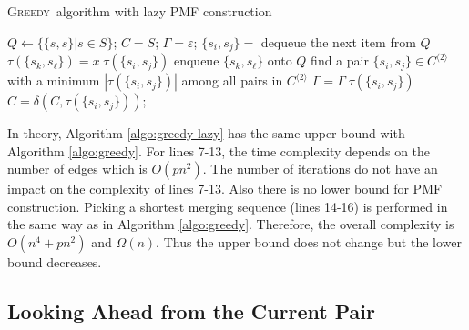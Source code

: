 \documentclass[12pt]{article}
\newcommand{\greedyAlgo}{\textsc{Greedy}}
\begin{document}
\begin{algorithm}[ht]	
	\caption{\greedyAlgo\ algorithm with lazy PMF construction}
	\label{algo:greedy-lazy}
	
	$Q \longleftarrow \{ \{ s,s \}| s \in S \}$; 
	$C = S$; 
	$\Gamma = \varepsilon$; 
	{
		{
			$\{ s_i, s_j \} = $ dequeue the next item from $Q$\;
			{
				{
					{
						$\tau(\{ s_k, s_\ell \}) = x \; \tau(\{ s_i, s_j\})$\;
						enqueue $\{ s_k,s_\ell \}$ onto $Q$\;
					}
				}
			} 		
		}
		find a pair $\{ s_i, s_j \} \in C^{\langle 2 \rangle}$ 
		with a minimum $|\tau(\{ s_i,s_j \})|$ among all pairs 
		in $C^{\langle 2 \rangle}$\;
		$\Gamma = \Gamma \; \tau(\{ s_i, s_j \})$\;
		$C = \delta(C,\tau(\{ s_i,s_j\}))$;
	}
\end{algorithm}

In theory, Algorithm \ref{algo:greedy-lazy} has the same upper bound with Algorithm \ref{algo:greedy}. For lines 7-13, the time complexity depends on the number of edges which is $O(pn^2)$. The number of iterations do not have an impact on the complexity of lines 7-13. Also there is no lower bound for PMF construction. Picking a shortest merging sequence (lines 14-16) is performed in the same way as in Algorithm \ref{algo:greedy}. Therefore, the overall complexity is $O(n^4+ pn^2)$ and $\Omega(n)$. Thus the upper bound does not change but the lower bound decreases.

\subsection{Looking Ahead from the Current Pair}
\label{sec:lookahead}
\end{document}
